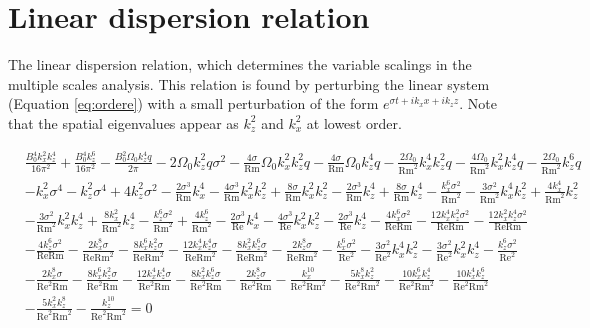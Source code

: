 \documentclass[twocolumn]{aastex61}
\newcommand{\beq}{\begin{equation}}
\newcommand{\eeq}{\end{equation}}
\newcommand\reye{\mathrm{Re}}
\newcommand\reym{\mathrm{Rm}}
\begin{document}
\section{Linear dispersion relation}\label{app:dispersion}

The linear dispersion relation, which determines the variable scalings in the multiple scales analysis. This relation is found by perturbing the linear system (Equation \ref{eq:ordere}) with a small perturbation of the form $e^{\sigma t + i k_x x + i k_z z}$. Note that the spatial eigenvalues appear as $k_z^2$ and $k_x^2$ at lowest order.

\beq
\begin{split}
& \frac{B_{0}^{4} k_{x}^{2} k_{z}^{4}}{16 \pi^{2}} + \frac{B_{0}^{4} k_{z}^{6}}{16 \pi^{2}} - \frac{B_{0}^{2} \Omega_{0} k_{z}^{4} q}{2 \pi} - 2 \Omega_{0} k_{z}^{2} q \sigma^{2} - \frac{4 \sigma}{\reym} \Omega_{0} k_{x}^{2} k_{z}^{2} q - \frac{4 \sigma}{\reym} \Omega_{0} k_{z}^{4} q - \frac{2 \Omega_{0}}{\reym^{2}} k_{x}^{4} k_{z}^{2} q - \frac{4 \Omega_{0}}{\reym^{2}} k_{x}^{2} k_{z}^{4} q - \frac{2 \Omega_{0}}{\reym^{2}} k_{z}^{6} q \\
& - k_{x}^{2} \sigma^{4} - k_{z}^{2} \sigma^{4} + 4 k_{z}^{2} \sigma^{2} - \frac{2 \sigma^{3}}{\reym} k_{x}^{4} - \frac{4 \sigma^{3}}{\reym} k_{x}^{2} k_{z}^{2} + \frac{8 \sigma}{\reym} k_{x}^{2} k_{z}^{2} - \frac{2 \sigma^{3}}{\reym} k_{z}^{4} + \frac{8 \sigma}{\reym} k_{z}^{4} - \frac{k_{x}^{6} \sigma^{2}}{\reym^{2}} - \frac{3 \sigma^{2}}{\reym^{2}} k_{x}^{4} k_{z}^{2} + \frac{4 k_{x}^{4}}{\reym^{2}} k_{z}^{2} \\
& - \frac{3 \sigma^{2}}{\reym^{2}} k_{x}^{2} k_{z}^{4} + \frac{8 k_{x}^{2}}{\reym^{2}} k_{z}^{4} - \frac{k_{z}^{6} \sigma^{2}}{\reym^{2}} + \frac{4 k_{z}^{6}}{\reym^{2}} - \frac{2 \sigma^{3}}{\reye} k_{x}^{4} - \frac{4 \sigma^{3}}{\reye} k_{x}^{2} k_{z}^{2} - \frac{2 \sigma^{3}}{\reye} k_{z}^{4} - \frac{4 k_{x}^{6} \sigma^{2}}{\reye \reym} -  \frac{12 k_{x}^{4} k_{z}^{2} \sigma^{2}}{\reye \reym} - \frac{12 k_{x}^{2} k_{z}^{4} \sigma^{2}}{\reye \reym} \\
& - \frac{4 k_{z}^{6} \sigma^{2}}{\reye \reym} - \frac{2 k_{x}^{8} \sigma}{\reye \reym^{2}} - \frac{8 k_{x}^{6} k_{z}^{2} \sigma}{\reye \reym^{2}} - \frac{12 k_{x}^{4} k_{z}^{4} \sigma}{\reye \reym^{2}} - \frac{8 k_{x}^{2} k_{z}^{6} \sigma}{\reye \reym^{2}} - \frac{2 k_{z}^{8} \sigma}{\reye \reym^{2}} - \frac{k_{x}^{6} \sigma^{2}}{\reye^{2}} - \frac{3 \sigma^{2}}{\reye^{2}} k_{x}^{4} k_{z}^{2} - \frac{3 \sigma^{2}}{\reye^{2}} k_{x}^{2} k_{z}^{4} - \frac{k_{z}^{6} \sigma^{2}}{\reye^{2}} \\
& - \frac{2 k_{x}^{8} \sigma}{\reye^{2} \reym} - \frac{8 k_{x}^{6} k_{z}^{2} \sigma}{\reye^{2} \reym} - \frac{12 k_{x}^{4} k_{z}^{4} \sigma}{\reye^{2} \reym} - \frac{8 k_{x}^{2} k_{z}^{6} \sigma}{\reye^{2} \reym} - \frac{2 k_{z}^{8} \sigma}{\reye^{2} \reym} - \frac{k_{x}^{10}}{\reye^{2} \reym^{2}} - \frac{5 k_{x}^{8} k_{z}^{2}}{\reye^{2} \reym^{2}} - \frac{10 k_{x}^{6} k_{z}^{4}}{\reye^{2} \reym^{2}} - \frac{10 k_{x}^{4} k_{z}^{6}}{\reye^{2} \reym^{2}} \\
& - \frac{5 k_{x}^{2} k_{z}^{8}}{\reye^{2} \reym^{2}} - \frac{k_{z}^{10}}{\reye^{2} \reym^{2}} = 0
\end{split}
\eeq
\end{document}
